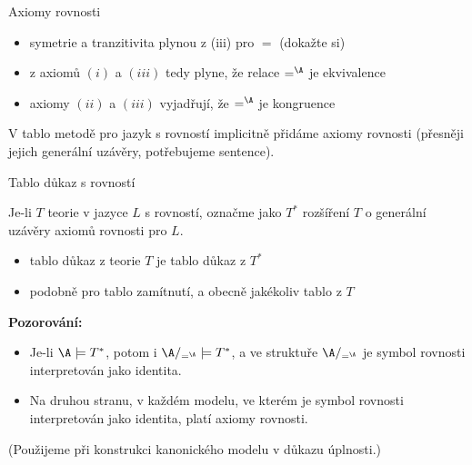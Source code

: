 \documentclass{beamer}
\begin{document}
\begin{frame}{Axiomy rovnosti}


    \pause
    \begin{itemize}
        \item symetrie a tranzitivita plynou z (iii) pro $=$ (dokažte si)\pause
        \item z axiomů $(i)$ a $(iii)$ tedy plyne, že relace $=^\A$ je ekvivalence\pause
        \item axiomy $(ii)$ a $(iii)$ vyjadřují, že $=^\A$ je kongruence\pause
    \end{itemize}

    V tablo metodě pro jazyk s rovností implicitně přidáme axiomy rovnosti (přesněji jejich generální uzávěry, potřebujeme sentence).

\end{frame}


\begin{frame}{Tablo důkaz s rovností}

    \pause
    Je-li $T$ teorie v jazyce $L$ s rovností, označme jako $T^*$ rozšíření $T$ o generální uzávěry axiomů rovnosti pro $L$. 

    \pause
    \begin{itemize}
        \item \alert{tablo důkaz} z teorie $T$ je \alert{tablo důkaz} z $T^*$\pause
        \item podobně pro tablo zamítnutí, a obecně jakékoliv tablo z $T$
    \end{itemize}
 
    \pause
    \textbf{Pozorování:}\pause
    \begin{itemize}
        \item Je-li $\A\models T^*$, potom i $\A/_{=^\A}\models T^*$, a ve struktuře $\A/_{=^\A}$ je symbol rovnosti interpretován jako identita.\pause
        \item Na druhou stranu, v každém modelu, ve kterém je symbol rovnosti interpretován jako identita, platí axiomy rovnosti.
    \end{itemize}
     
    \pause
    (Použijeme při konstrukci \alert{kanonického modelu} v důkazu úplnosti.)

\end{frame}
\end{document}
